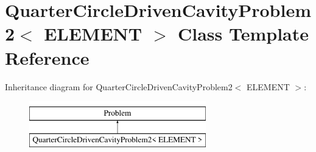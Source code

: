 \hypertarget{classQuarterCircleDrivenCavityProblem2}{}\section{Quarter\+Circle\+Driven\+Cavity\+Problem2$<$ E\+L\+E\+M\+E\+NT $>$ Class Template Reference}
\label{classQuarterCircleDrivenCavityProblem2}
Inheritance diagram for Quarter\+Circle\+Driven\+Cavity\+Problem2$<$ E\+L\+E\+M\+E\+NT $>$\+:\begin{figure}[H]
\begin{center}
\leavevmode
\includegraphics[height=2.000000cm]{classQuarterCircleDrivenCavityProblem2}
\end{center}
\end{figure}

